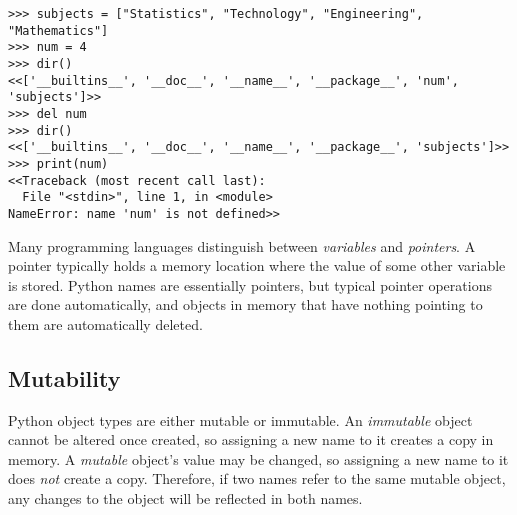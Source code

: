 \begin{lstlisting}
>>> subjects = ["Statistics", "Technology", "Engineering", "Mathematics"]
>>> num = 4
>>> dir()
<<['__builtins__', '__doc__', '__name__', '__package__', 'num', 'subjects']>>
>>> del num
>>> dir()
<<['__builtins__', '__doc__', '__name__', '__package__', 'subjects']>>
>>> print(num)
<<Traceback (most recent call last):
  File "<stdin>", line 1, in <module>
NameError: name 'num' is not defined>>
\end{lstlisting}

\begin{info}
Many programming languages distinguish between \emph{variables} and \emph{pointers}.
A pointer typically holds a memory location where the value of some other variable is stored.
% 
Python names are essentially pointers, but typical pointer operations are done automatically, and objects in memory that have nothing pointing to them are automatically deleted.
\end{info}

\subsection*{Mutability}

Python object types are either mutable or immutable.
An \emph{immutable} object cannot be altered once created, so assigning a new name to it creates a copy in memory.
A \emph{mutable} object's value may be changed, so assigning a new name to it does \emph{not} create a copy.
Therefore, if two names refer to the same mutable object, any changes to the object will be reflected in both names.

